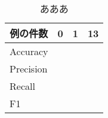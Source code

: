 \begin{table}[H]
\centering
\caption{あああ}
\begin{tabular}{|l||l|l|l|}
\hline
\multicolumn{1}{|c||}{例の件数} & \multicolumn{1}{c|}{0} & \multicolumn{1}{c|}{1} & \multicolumn{1}{c|}{13} \\ \hline
Accuracy    & & &\\ \hline
Precision   & & &\\ \hline
Recall      & & &\\ \hline
F1          & & &\\ \hline
\end{tabular}
\label{spoken-book}
\end{table}